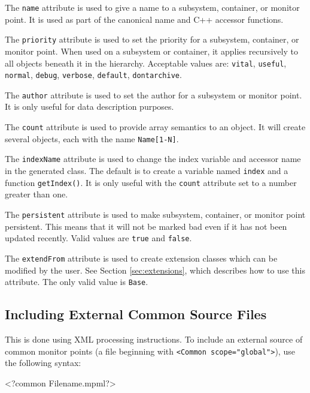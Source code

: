 \documentclass[letterpaper,12pt,oneside,pdftex]{article}
\newcommand{\shadebox}[1]{\fcolorbox{black}{shade}{\begin{minipage}{\textwidth}#1\end{minipage}}}
\newcommand{\mpml}[1]{\texttt{<#1>}}
\newcommand{\attr}[1]{\texttt{#1}}
\begin{document}
The \attr{name} attribute is used to give a name to a subsystem, container, or
monitor point. It is used as part of the canonical name and C++ accessor
functions.

The \attr{priority} attribute is used to set the priority for a subsystem,
container, or monitor point. When used on a subsystem or container, it applies
recursively to all objects beneath it in the hierarchy. Acceptable values are:
\texttt{vital}, \texttt{useful}, \texttt{normal}, \texttt{debug},
\texttt{verbose}, \texttt{default}, \texttt{dontarchive}.

The \attr{author} attribute is used to set the author for a subsystem or monitor
point. It is only useful for data description purposes.

The \attr{count} attribute is used to provide array semantics to an object. It
will create several objects, each with the name \texttt{Name[1-N]}.

The \attr{indexName} attribute is used to change the index variable and accessor
name in the generated class. The default is to create a variable named
\texttt{index} and a function \texttt{getIndex()}. It is only useful with the
\attr{count} attribute set to a number greater than one.

The \attr{persistent} attribute is used to make subsystem, container, or monitor
point persistent. This means that it will not be marked bad even if it has not
been updated recently. Valid values are \texttt{true} and \texttt{false}.

The \attr{extendFrom} attribute is used to create extension classes which can be
modified by the user. See Section \ref{sec:extensions}, which describes how to
use this attribute.  The only valid value is \texttt{Base}.

\subsection{Including External Common Source Files}

This is done using XML processing instructions. To include an external source of
common monitor points (a file beginning with \mpml{Common scope="global"}), use
the following syntax:

\begin{verbbox}
<?common Filename.mpml?>
\end{verbbox}
\shadebox{\theverbbox}

\end{document}
